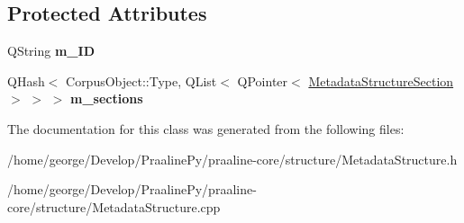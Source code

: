 \subsection*{Protected Attributes}
\begin{DoxyCompactItemize}
\item 
\mbox{\label{class_metadata_structure_ad4425b7a6dd45991ed176c8cbe3cf850}} 
Q\+String {\bfseries m\+\_\+\+ID}
\item 
\mbox{\label{class_metadata_structure_a62ca27384f5bf78ac32588dc57ca1526}} 
Q\+Hash$<$ Corpus\+Object\+::\+Type, Q\+List$<$ Q\+Pointer$<$ \hyperlink{class_metadata_structure_section}{Metadata\+Structure\+Section} $>$ $>$ $>$ {\bfseries m\+\_\+sections}
\end{DoxyCompactItemize}


The documentation for this class was generated from the following files\+:\begin{DoxyCompactItemize}
\item 
/home/george/\+Develop/\+Praaline\+Py/praaline-\/core/structure/Metadata\+Structure.\+h\item 
/home/george/\+Develop/\+Praaline\+Py/praaline-\/core/structure/Metadata\+Structure.\+cpp\end{DoxyCompactItemize}
